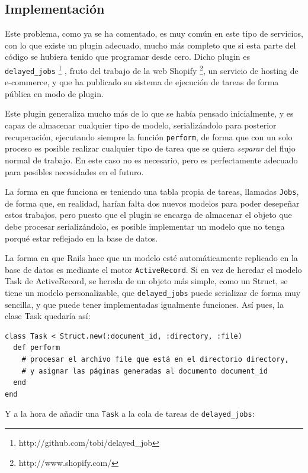 
\subsection{Implementación} %
\label{sub:implementación}

Este problema, como ya se ha comentado, es muy común en este tipo de servicios, con lo que existe un plugin adecuado, mucho más completo que si esta parte del código se hubiera tenido que programar desde cero. Dicho plugin es \texttt{delayed\_jobs} \footnote{http://github.com/tobi/delayed\_job} , fruto del trabajo de la web Shopify \footnote{http://www.shopify.com/}, un servicio de hosting de e-commerce, y que ha publicado su sistema de ejecución de tareas de forma pública en modo de plugin.

Este plugin generaliza mucho más de lo que se había pensado inicialmente, y es capaz de almacenar cualquier tipo de modelo, serializándolo para posterior recuperación, ejecutando siempre la función \texttt{perform}, de forma que con un solo proceso es posible realizar cualquier tipo de tarea que se quiera \emph{separar} del flujo normal de trabajo. En este caso no es necesario, pero es perfectamente adecuado para posibles necesidades en el futuro.

La forma en que funciona es teniendo una tabla propia de tareas, llamadas \texttt{Jobs}, de forma que, en realidad, harían falta dos nuevos modelos para poder desepeñar estos trabajos, pero puesto que el plugin se encarga de almacenar el objeto que debe procesar serializándolo, es posible implementar un modelo que no tenga porqué estar reflejado en la base de datos.

La forma en que Rails hace que un modelo esté automáticamente replicado en la base de datos es mediante el motor \texttt{ActiveRecord}. Si en vez de heredar el modelo Task de ActiveRecord, se hereda de un objeto más simple, como un Struct, se tiene un modelo personalizable, que \texttt{delayed\_jobs} puede serializar de forma muy sencilla, y que puede tener implementadas igualmente funciones. Así pues, la clase Task quedaría así:
\begin{verbatim}
class Task < Struct.new(:document_id, :directory, :file)
  def perform
    # procesar el archivo file que está en el directorio directory,
    # y asignar las páginas generadas al documento document_id
  end    
end
\end{verbatim}

Y a la hora de añadir una \texttt{Task} a la cola de tareas de \texttt{delayed\_jobs}:

